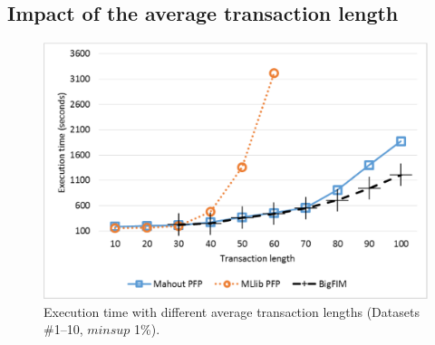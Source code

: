 \documentclass[preprint,review,12pt]{elsarticle}
\begin{document}




\subsection{Impact of the average transaction length}
\label{attributes_exp}

\begin{figure}[!t]
\includegraphics[width=5in]{attributes.eps}
\caption{Execution time with different average transaction lengths %
(Datasets \#1--10, $minsup$ 1\%).}
\label{attributes}
\end{figure}
\end{document}
